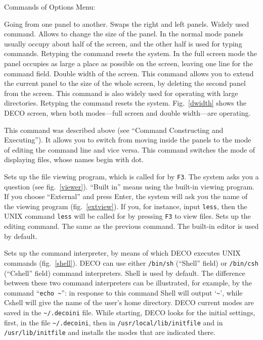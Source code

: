 Commands of Options Menu:
\begin{example}
Going from one panel to another.
Swaps the right and left panels.
Widely used command. Allows to change the size of the panel. In the normal
mode panels usually occupy about half of the screen, and the other half is
used for typing commands. Retyping the command resets the system. In the full
screen mode the panel occupies as large a place as possible on the screen,
leaving one line for the command field.
Double width of the screen. This command allows you to extend the
current panel to the size of the whole screen, by deleting the second panel
from the screen. This command is also widely used for operating with large
directories. Retyping the command resets the system. Fig.~\ref{dwidth}
shows the DECO screen, when both modes---full screen and double width---are
operating. 


This command was described above (see ``Command Constructing and Executing'').
It allows you to switch from moving inside the panels to the mode of
editing the command line and vice versa.
This command switches the mode of displaying files, whose names begin with dot.



Sets up the file viewing program, which is called for by {\tt F3}.
The system asks you a question (see fig.~\ref{viewer}). ``Built in''
means using the built-in viewing program.
If you choose ``External'' and press Enter, the system will ask you the name
of the viewing program (fig.~\ref{extview}). If you, for instance, input
{\tt less}, then the UNIX command {\tt less} will be called for by pressing
{\tt F3} to view files.
Sets up the editing command. The same as the previous command. The built-in
editor is used by default. 


Sets up the command interpreter, by means of which DECO executes UNIX
commands (fig.~\ref{shell}). DECO can use either {\tt /bin/sh} (``Shell''
field) or {\tt /bin/csh} (``Cshell'' field) command interpreters. Shell is
used by default. The difference between these two command interpreters can be
illustrated, for example, by the command ``{\tt echo \~{}}'': in response to
this command Shell will output `{\tt \~{}}', while Cshell will give
the name of the user's home directory.
DECO current modes are saved in the {\tt \~{}/.decoini} file.
While starting, DECO looks for the initial settings, first,
in the file {\tt \~{}/.decoini}, then in {\tt /usr/local/lib/initfile} and in
{\tt /usr/lib/initfile} and installs the modes that are indicated there.
\end{example}


